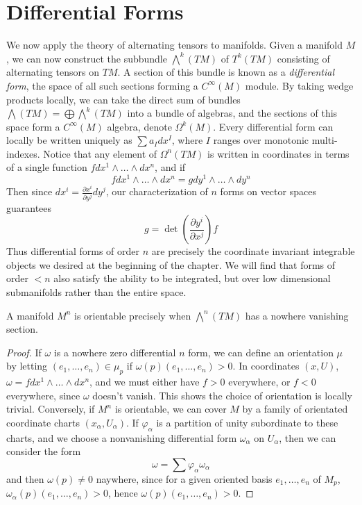 \section{Differential Forms}

We now apply the theory of alternating tensors to manifolds. Given a manifold $M$, we can now construct the subbundle $\bigwedge^k(TM)$ of $T^k(TM)$ consisting of alternating tensors on $TM$. A section of this bundle is known as a \emph{differential form}, the space of all such sections forming a $C^\infty(M)$ module. By taking wedge products locally, we can take the direct sum of bundles $\bigwedge(TM) = \bigoplus \bigwedge^k(TM)$ into a bundle of algebras, and the sections of this space form a $C^\infty(M)$ algebra, denote $\Omega^k(M)$. Every differential form can locally be written uniquely as $\sum a_I dx^I$, where $I$ ranges over monotonic multi-indexes. Notice that any element of $\Omega^n(TM)$ is written in coordinates in terms of a single function $f dx^1 \wedge \dots \wedge dx^n$, and if
%
\[ f dx^1 \wedge \dots \wedge dx^n = g dy^1 \wedge \dots \wedge dy^n \]
%
Then since $dx^i = \frac{\partial x^i}{\partial y^j} dy^j$, our characterization of $n$ forms on vector spaces guarantees
%
\[ g = \det \left( \frac{\partial y^i}{\partial x^j} \right) f \]
%
Thus differential forms of order $n$ are precisely the coordinate invariant integrable objects we desired at the beginning of the chapter. We will find that forms of order $< n$ also satisfy the ability to be integrated, but over low dimensional submanifolds rather than the entire space.

\begin{theorem}
    A manifold $M^n$ is orientable precisely when $\bigwedge^n(TM)$ has a nowhere vanishing section.
\end{theorem}
\begin{proof}
    If $\omega$ is a nowhere zero differential $n$ form, we can define an orientation $\mu$ by letting $(e_1, \dots, e_n) \in \mu_p$ if $\omega(p)(e_1, \dots, e_n) > 0$. In coordinates $(x,U)$, $\omega = f dx^1 \wedge \dots \wedge dx^n$, and we must either have $f > 0$ everywhere, or $f < 0$ everywhere, since $\omega$ doesn't vanish. This shows the choice of orientation is locally trivial. Conversely, if $M^n$ is orientable, we can cover $M$ by a family of orientated coordinate charts $(x_\alpha, U_\alpha)$. If $\varphi_\alpha$ is a partition of unity subordinate to these charts, and we choose a nonvanishing differential form $\omega_\alpha$ on $U_\alpha$, then we can consider the form
    \[ \omega = \sum \varphi_\alpha \omega_\alpha \]
    and then $\omega(p) \neq 0$ naywhere, since for a given oriented basis $e_1, \dots, e_n$ of $M_p$, $\omega_\alpha(p)(e_1, \dots, e_n) > 0$, hence $\omega(p)(e_1, \dots, e_n) > 0$.
\end{proof}

